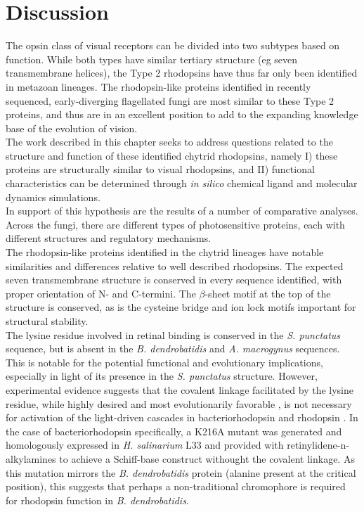 \section{Discussion}
The opsin class of visual receptors can be divided into two subtypes based on function. While both types have similar tertiary structure (eg seven transmembrane helices), the Type 2 rhodopsins have thus far only been identified in metazoan lineages. The rhodopsin-like proteins identified in recently sequenced, early-diverging flagellated fungi are most similar to these Type 2 proteins, and thus are in an excellent position to add to the expanding knowledge base of the evolution of vision.\\
\indent The work described in this chapter seeks to address questions related to the structure and function of these identified chytrid rhodopsins, namely I) these proteins are structurally similar to visual rhodopsins, and II) functional characteristics can be determined through \textit{in silico} chemical ligand and molecular dynamics simulations.\\
\indent In support of this hypothesis are the results of a number of comparative analyses. Across the fungi, there are different types of photosensitive proteins, each with different structures and regulatory mechanisms.\\
\indent The rhodopsin-like proteins identified in the chytrid lineages have notable similarities and differences relative to well described rhodopsins. The expected seven transmembrane structure is conserved in every sequence identified, with proper orientation of N- and C-termini. The $\beta$-sheet motif at the top of the structure is conserved, as is the cysteine bridge and ion lock motifs important for structural stability.\\
\indent The lysine residue involved in retinal binding is conserved in the \textit{S. punctatus} sequence, but is absent in the \textit{B. dendrobatidis} and \textit{A. macrogynus} sequences. This is notable for the potential functional and evolutionary implications, especially in light of its presence in the \textit{S. punctatus} structure. However, experimental evidence suggests that the covalent linkage facilitated by the lysine residue, while highly desired and most evolutionarily favorable \cite{Sekharan2011}, is not necessary for activation of the light-driven cascades in bacteriorhodopsin \cite{Schweiger1994} and rhodopsin \cite{Zhukovsky1992}. In the case of bacteriorhodopsin specifically, a K216A mutant was generated and homologously expressed in \textit{H. salinarium} L33 and provided with retinylidene-n-alkylamines to achieve a Schiff-base construct withought the covalent linkage. As this mutation mirrors the \textit{B. dendrobatidis} protein (alanine present at the critical position), this suggests that perhaps a non-traditional chromophore is required for rhodopsin function in \textit{B. dendrobatidis}.\\
